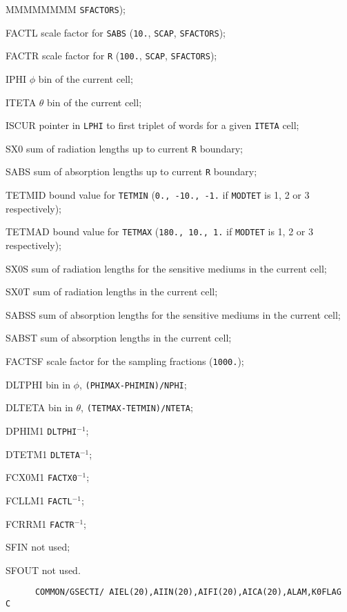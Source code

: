 \begin{DLtt}{MMMMMMMM}
{\tt SFACTORS});
\item[FACTL] scale factor for {\tt SABS} ({\tt 10.}, {\tt SCAP},
{\tt SFACTORS});
\item[FACTR] scale factor for {\tt R} ({\tt 100.},
{\tt SCAP}, {\tt SFACTORS});
\item[IPHI]  $\phi$ bin of the current cell;
\item[ITETA] $\theta$ bin of the current cell;
\item[ISCUR] pointer in {\tt LPHI} to first triplet of words for a
given {\tt ITETA} cell;
\item[SX0] sum of radiation lengths up to current {\tt R} boundary;
\item[SABS] sum of absorption lengths up to current {\tt R} boundary;
\item[TETMID] bound value for {\tt TETMIN} ({\tt 0., -10., -1.} if
{\tt MODTET} is 1, 2 or 3 respectively);
\item[TETMAD] bound value for {\tt TETMAX} ({\tt 180., 10., 1.} if
{\tt MODTET} is 1, 2 or 3 respectively);
\item[SX0S] sum of radiation lengths for the sensitive mediums in the
current cell;
\item[SX0T] sum of radiation lengths in the current cell;
\item[SABSS] sum of absorption lengths for the sensitive mediums in
the current cell;
\item[SABST] sum of absorption lengths in the current cell;
\item[FACTSF] scale factor for the sampling fractions ({\tt 1000.});
\item[DLTPHI] bin in $\phi$, {\tt (PHIMAX-PHIMIN)/NPHI};
\item[DLTETA] bin in $\theta$, {\tt (TETMAX-TETMIN)/NTETA};
\item[DPHIM1] {\tt DLTPHI}$^{-1}$;
\item[DTETM1] {\tt DLTETA}$^{-1}$;
\item[FCX0M1] {\tt FACTX0}$^{-1}$;
\item[FCLLM1] {\tt FACTL}$^{-1}$;
\item[FCRRM1] {\tt FACTR}$^{-1}$;
\item[SFIN] not used;
\item[SFOUT] not used.
\end{DLtt}
\begin{verbatim}
      COMMON/GSECTI/ AIEL(20),AIIN(20),AIFI(20),AICA(20),ALAM,K0FLAG
C
\end{verbatim}
